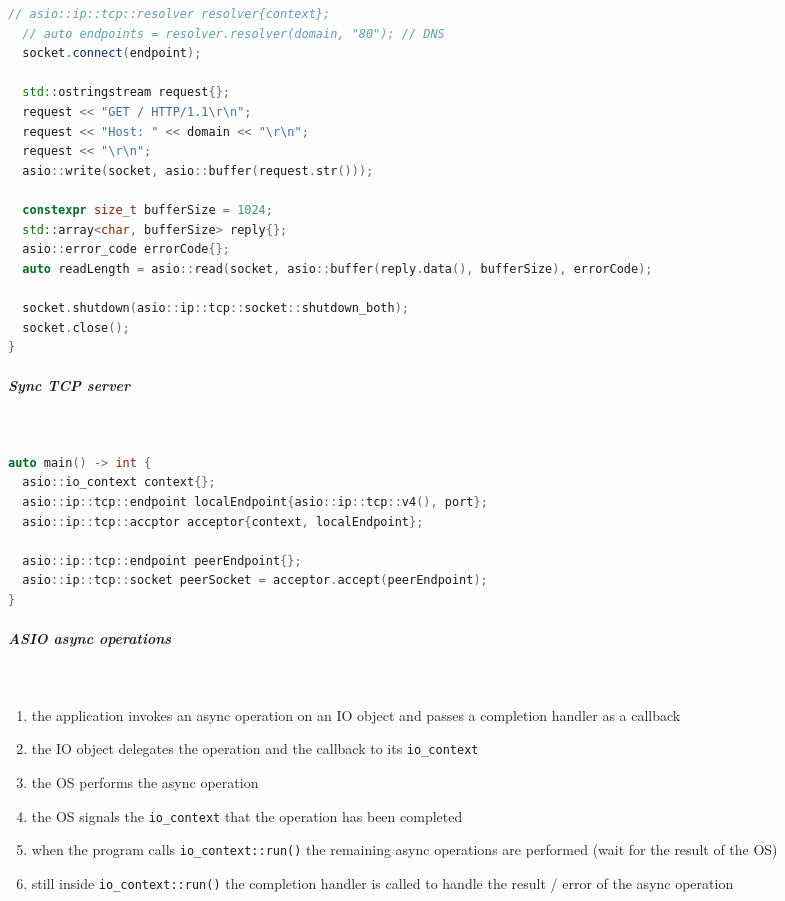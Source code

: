 \documentclass[11pt,twoside,landscape]{article}
\begin{document}
\begin{multicols}{2}
\begin{lstlisting}[language=c++,label=lst:org3ddee7e,caption={Client connection example using ASIO},captionpos=b,numbers=none]
  // asio::ip::tcp::resolver resolver{context};
  // auto endpoints = resolver.resolver(domain, "80"); // DNS
  socket.connect(endpoint);

  std::ostringstream request{};
  request << "GET / HTTP/1.1\r\n";
  request << "Host: " << domain << "\r\n";
  request << "\r\n";
  asio::write(socket, asio::buffer(request.str()));

  constexpr size_t bufferSize = 1024;
  std::array<char, bufferSize> reply{};
  asio::error_code errorCode{};
  auto readLength = asio::read(socket, asio::buffer(reply.data(), bufferSize), errorCode);

  socket.shutdown(asio::ip::tcp::socket::shutdown_both);
  socket.close();
}
\end{lstlisting}

\subparagraph{Sync TCP server} \
\label{sec:org63c98e4}
\begin{lstlisting}[language=c++,label=lst:org5980747,caption={Server example using ASIO},captionpos=b,numbers=none]
auto main() -> int {
  asio::io_context context{};
  asio::ip::tcp::endpoint localEndpoint{asio::ip::tcp::v4(), port};
  asio::ip::tcp::accptor acceptor{context, localEndpoint};

  asio::ip::tcp::endpoint peerEndpoint{};
  asio::ip::tcp::socket peerSocket = acceptor.accept(peerEndpoint);
}
\end{lstlisting}

\subparagraph{ASIO async operations} \
\label{sec:orgb413bdc}
\begin{enumerate}
\item the application invokes an async operation on an IO object and passes a completion handler as a callback
\item the IO object delegates the operation and the callback to its \texttt{io\_context}
\item the OS performs the async operation
\item the OS signals the \texttt{io\_context} that the operation has been completed
\item when the program calls \texttt{io\_context::run()} the remaining async operations are performed (wait for the result of the OS)
\item still inside \texttt{io\_context::run()} the completion handler is called to handle the result / error of the async operation
\end{enumerate}



\end{multicols}
\end{document}
